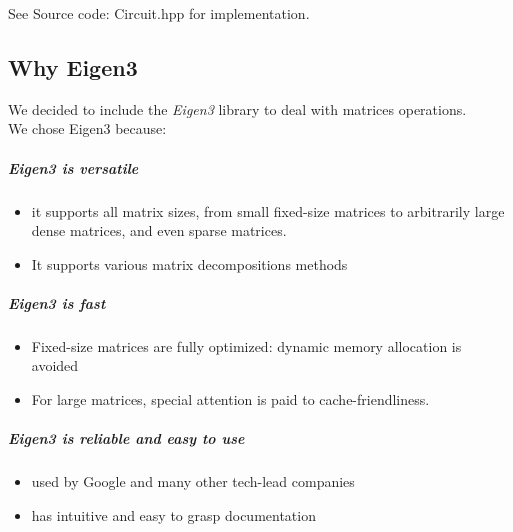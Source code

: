 \documentclass{article}
\begin{document}
\bigbreak
See Source code: Circuit.hpp for implementation.

\newpage
\subsection{Why Eigen3}
We decided to include the \textit{Eigen3} library to deal with matrices operations.\\
We chose Eigen3 because:
\subparagraph{Eigen3 is versatile}
\begin{itemize}
    \item it supports all matrix sizes, from small fixed-size matrices to arbitrarily large dense matrices, and even sparse matrices.
    \item It supports various matrix decompositions methods
\end{itemize}
\subparagraph{Eigen3 is fast}
\begin{itemize}
    \item Fixed-size matrices are fully optimized: dynamic memory allocation is avoided
    \item For large matrices, special attention is paid to cache-friendliness.
\end{itemize}
\subparagraph{Eigen3 is reliable and easy to use}
\begin{itemize}
    \item used by Google and many other tech-lead companies
    \item has intuitive and easy to grasp documentation
\end{itemize}
\newpage
\end{document}
